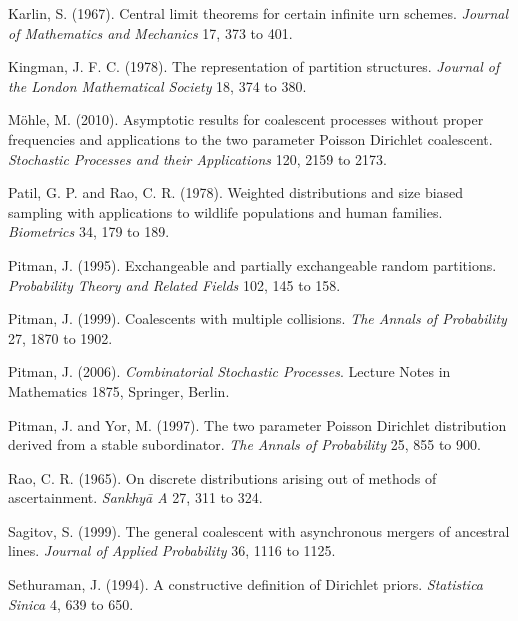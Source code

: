 \begin{thebibliography}{}
Karlin, S. (1967). Central limit theorems for certain infinite urn schemes. \emph{Journal of
Mathematics and Mechanics} 17, 373 to 401.

Kingman, J. F. C. (1978). The representation of partition structures. \emph{Journal of the London
Mathematical Society} 18, 374 to 380.

M\"ohle, M. (2010). Asymptotic results for coalescent processes without proper frequencies and
applications to the two parameter Poisson Dirichlet coalescent. \emph{Stochastic Processes and
their Applications} 120, 2159 to 2173.

Patil, G. P. and Rao, C. R. (1978). Weighted distributions and size biased sampling with
applications to wildlife populations and human families. \emph{Biometrics} 34, 179 to 189.

Pitman, J. (1995). Exchangeable and partially exchangeable random partitions. \emph{Probability
Theory and Related Fields} 102, 145 to 158.

Pitman, J. (1999). Coalescents with multiple collisions. \emph{The Annals of Probability} 27,
1870 to 1902.

Pitman, J. (2006). \emph{Combinatorial Stochastic Processes}. Lecture Notes in Mathematics 1875,
Springer, Berlin.

Pitman, J. and Yor, M. (1997). The two parameter Poisson Dirichlet distribution derived from a
stable subordinator. \emph{The Annals of Probability} 25, 855 to 900.

Rao, C. R. (1965). On discrete distributions arising out of methods of ascertainment.
\emph{Sankhy\=a A} 27, 311 to 324.

Sagitov, S. (1999). The general coalescent with asynchronous mergers of ancestral lines.
\emph{Journal of Applied Probability} 36, 1116 to 1125.

Sethuraman, J. (1994). A constructive definition of Dirichlet priors. \emph{Statistica Sinica} 4,
639 to 650.

\end{thebibliography}
